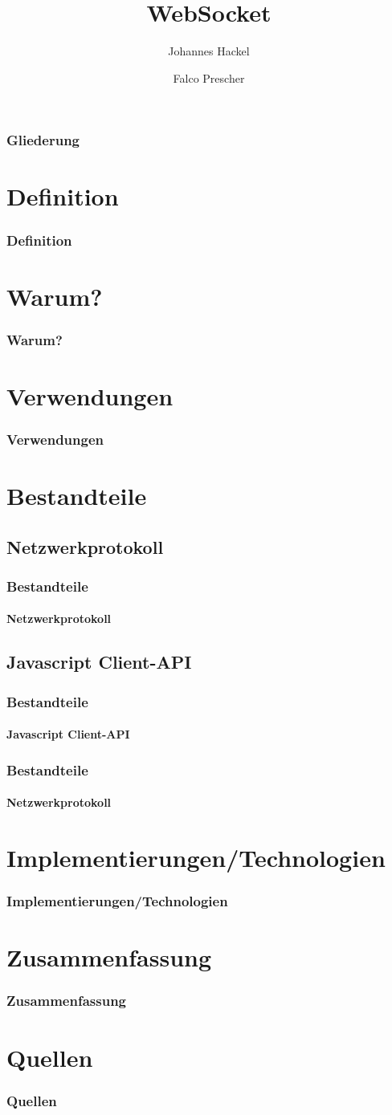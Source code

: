 \documentclass{beamer}
\author{Johannes Hackel\and Falco Prescher}
\title{WebSocket}
\begin{document}
\begin{frame}
\titlepage
\end{frame}

\begin{frame}
\frametitle{Gliederung}
\tableofcontents
\end{frame}

\section{Definition}
\begin{frame}
\frametitle{Definition}
\end{frame}

\section{Warum?}
\begin{frame}
\frametitle{Warum?}
\end{frame}

\section{Verwendungen}
\begin{frame}
\frametitle{Verwendungen}
\end{frame}

\section{Bestandteile}

\subsection{Netzwerkprotokoll}
\begin{frame}
\frametitle{Bestandteile}
\framesubtitle{Netzwerkprotokoll}
\end{frame}

\subsection{Javascript Client-API}
\begin{frame}
\frametitle{Bestandteile}
\framesubtitle{Javascript Client-API}
\end{frame}

\begin{frame}
\frametitle{Bestandteile}
\framesubtitle{Netzwerkprotokoll}
\end{frame}

\section{Implementierungen/Technologien}
\begin{frame}
\frametitle{Implementierungen/Technologien}
\end{frame}

\section{Zusammenfassung}
\begin{frame}
\frametitle{Zusammenfassung}
\end{frame}

\section{Quellen}
\begin{frame}
\frametitle{Quellen}
\end{frame}
\end{document}
